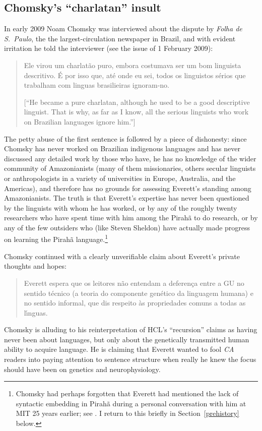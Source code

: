 \documentclass[output=paper,colorlinks,citecolor=brown
]{langscibook}
\begin{document}
\subsection{Chomsky's ``charlatan'' insult}

In early 2009 Noam Chomsky was interviewed about the dispute by
\textit{Folha de S.~Paulo}, the the largest-circulation newspaper in
Brazil, and with evident irritation he told the interviewer (see the
issue of 1 February 2009):
\begin{quote}
Ele virou um charlat{\~a}o puro, embora costumava ser um bom linguista
descritivo. {\'E} por isso que, at{\'e} onde eu sei, todos os linguistos
s{\'e}rios que trabalham com linguas brasilieiras ignoram-no.

[``He became a pure charlatan, although he used to be a good descriptive
linguist. That is why, as far as I know, all the serious linguists
who work on Brazilian languages ignore him.'']
\end{quote}

The petty abuse of the first sentence is followed by a piece of
dishonesty: since Chomsky has never worked on Brazilian indigenous
languages and has never discussed any detailed work by those who have,
he has no knowledge of the wider community of Amazonianists (many of
them missionaries, others secular linguists or anthropologists in a
variety of universities in Europe, Australia, and the Americas),
and therefore has no grounds for assessing Everett's standing among
Amazonianists. The truth is that Everett's expertise has never been
questioned by the linguists with whom he has worked, or by any of the
roughly twenty researchers who have spent time with him among the
Pirah{\~a} to do research, or by any of the few outsiders who (like
Steven Sheldon) have actually made progress on learning the
Pirah{\~a} language.\footnote{
   Chomsky had perhaps forgotten that Everett had mentioned the
   lack of syntactic embedding in Pirah{\~a} during a personal
   conversation with him at MIT 25 years earlier; see \citet[12, fn.\,7]{Everett07}.  I return to this briefly
   in Section~\ref{prehistory} below.}

Chomsky continued with a clearly unverifiable claim about Everett's
private thoughts and hopes:
\begin{quote}
Everett espera que os leitores n{\~a}o entendam a deferença entre a GU no
sentido t{\'e}cnico (a teoria do componente gen{\'e}tico da linguagem
humana) e no sentido informal, que dis respeito {\`a}s propriedades comuns
a todas as l{\'\i}nguas.

\end{quote}
Chomsky is alluding to his reinterpretation of HCL's ``recursion'' claims
as having never been about languages, but only about the genetically
transmitted human ability to acquire language. He is claiming that
Everett wanted to fool \textit{CA} readers into paying attention to
sentence structure when really he knew the focus should have been on
genetics and neurophysiology.
\end{document}
